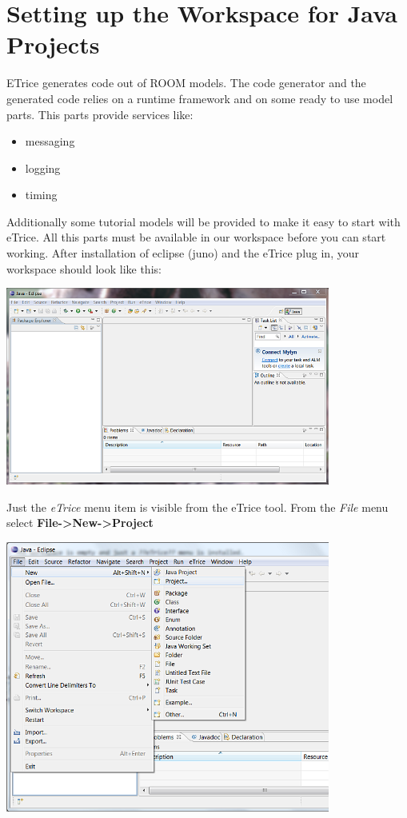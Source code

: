 \chapter{Setting up the Workspace for Java Projects}

ETrice generates code out of ROOM models. The code generator and the generated code relies on a runtime framework and on some ready to use model parts. This parts provide services like:

\begin{itemize}
\item messaging
\item logging
\item timing
\end{itemize}

Additionally some tutorial models will be provided to make it easy to start with eTrice. All this parts must be available in our workspace before you can start working. After installation of eclipse (juno) and the eTrice plug in, your workspace should look like this:  

\includegraphics[width=0.8\textwidth]{images/013-SetupWorkspace01.png}

Just the \textit{eTrice} menu item is visible from the eTrice tool.
From the \textit{File} menu select \textbf{File->New->Project}

\includegraphics[width=0.8\textwidth]{images/013-SetupWorkspace02.png}

